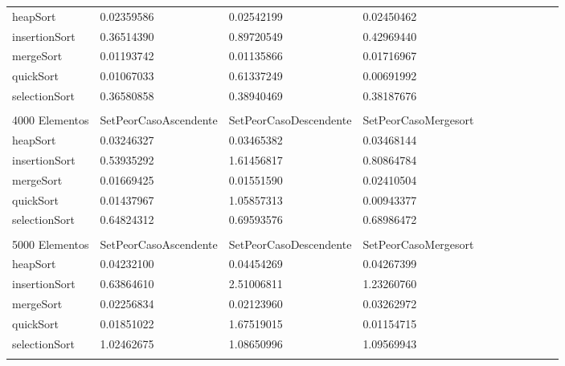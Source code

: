 \documentclass[article,a4paper]{article}
\begin{document}
\begin{table}[h]
\begin{adjustbox}{width=\textwidth,totalheight=\textheight,keepaspectratio}
\begin{tabular}{lllllllllll}
heapSort        & 0.02359586            & 0.02542199             & 0.02450462           \\
insertionSort   & 0.36514390            & 0.89720549             & 0.42969440           \\
mergeSort       & 0.01193742            & 0.01135866             & 0.01716967           \\
quickSort       & 0.01067033            & 0.61337249             & 0.00691992           \\
selectionSort   & 0.36580858            & 0.38940469             & 0.38187676           \\
                &                       &                        &                      \\
4000 Elementos  & SetPeorCasoAscendente & SetPeorCasoDescendente & SetPeorCasoMergesort \\
heapSort        & 0.03246327            & 0.03465382             & 0.03468144           \\
insertionSort   & 0.53935292            & 1.61456817             & 0.80864784           \\
mergeSort       & 0.01669425            & 0.01551590             & 0.02410504           \\
quickSort       & 0.01437967            & 1.05857313             & 0.00943377           \\
selectionSort   & 0.64824312            & 0.69593576             & 0.68986472           \\
                &                       &                        &                      \\
5000 Elementos  & SetPeorCasoAscendente & SetPeorCasoDescendente & SetPeorCasoMergesort \\
heapSort        & 0.04232100            & 0.04454269             & 0.04267399           \\
insertionSort   & 0.63864610            & 2.51006811             & 1.23260760           \\
mergeSort       & 0.02256834            & 0.02123960             & 0.03262972           \\
quickSort       & 0.01851022            & 1.67519015             & 0.01154715           \\
selectionSort   & 1.02462675            & 1.08650996             & 1.09569943           \\
                &                       &                        &                      \\

\end{tabular}
\end{adjustbox}
\end{table}
\end{document}
